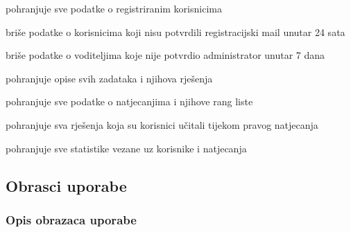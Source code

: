 \begin{packed_enum}
	\begin{packed_enum}
		
		\item pohranjuje sve podatke o registriranim korisnicima
		\item briše podatke o korisnicima koji nisu potvrdili registracijski mail unutar 24 sata 
		\item briše podatke o voditeljima koje nije potvrdio administrator unutar 7 dana
		\item pohranjuje opise svih zadataka i njihova rješenja
		\item pohranjuje sve podatke o natjecanjima i njihove rang liste
		\item pohranjuje sva rješenja koja su korisnici učitali tijekom pravog natjecanja
		\item pohranjuje sve statistike vezane uz korisnike i natjecanja
		
	\end{packed_enum}
\end{packed_enum}

\eject 
			
				
			\subsection{Obrasci uporabe}			
				
				\subsubsection{Opis obrazaca uporabe}
				
